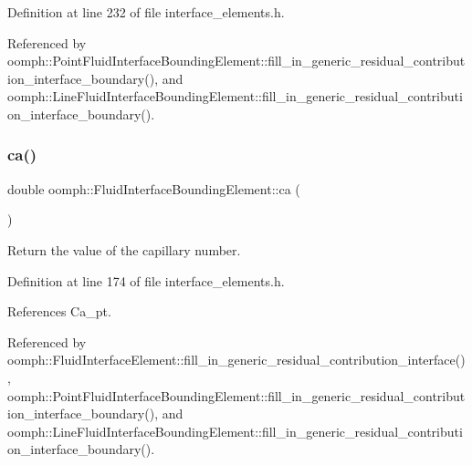 Definition at line 232 of file interface\+\_\+elements.\+h.



Referenced by oomph\+::\+Point\+Fluid\+Interface\+Bounding\+Element\+::fill\+\_\+in\+\_\+generic\+\_\+residual\+\_\+contribution\+\_\+interface\+\_\+boundary(), and oomph\+::\+Line\+Fluid\+Interface\+Bounding\+Element\+::fill\+\_\+in\+\_\+generic\+\_\+residual\+\_\+contribution\+\_\+interface\+\_\+boundary().

\mbox{\label{classoomph_1_1FluidInterfaceBoundingElement_ae5d097813762a2544d0b49c6e2fbaaac}} 
\subsubsection{\texorpdfstring{ca()}{ca()}}
{\footnotesize\ttfamily double oomph\+::\+Fluid\+Interface\+Bounding\+Element\+::ca (\begin{DoxyParamCaption}{ }\end{DoxyParamCaption})\hspace{0.3cm}{\ttfamily [inline]}}



Return the value of the capillary number. 



Definition at line 174 of file interface\+\_\+elements.\+h.



References Ca\+\_\+pt.



Referenced by oomph\+::\+Fluid\+Interface\+Element\+::fill\+\_\+in\+\_\+generic\+\_\+residual\+\_\+contribution\+\_\+interface(), oomph\+::\+Point\+Fluid\+Interface\+Bounding\+Element\+::fill\+\_\+in\+\_\+generic\+\_\+residual\+\_\+contribution\+\_\+interface\+\_\+boundary(), and oomph\+::\+Line\+Fluid\+Interface\+Bounding\+Element\+::fill\+\_\+in\+\_\+generic\+\_\+residual\+\_\+contribution\+\_\+interface\+\_\+boundary().

\mbox{\label{classoomph_1_1FluidInterfaceBoundingElement_acf132633ea7ed6b063c1f2a0a62d0b8c}} 
